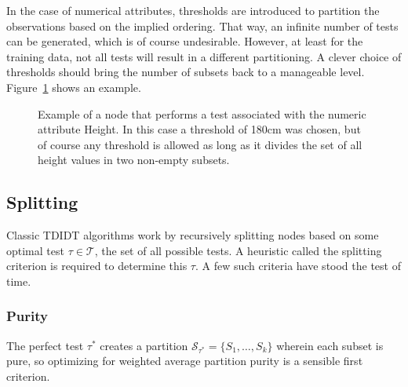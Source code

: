 In the case of numerical attributes, thresholds are introduced to partition the observations based on the implied ordering. That way, an infinite number of tests can be generated, which is of course undesirable. However, at least for the training data, not all tests will result in a different partitioning. A clever choice of thresholds should bring the number of subsets back to a manageable level. Figure~\ref{fig:numerical_split} shows an example.

\begin{figure}[htp]%
\label{fig:numerical_split}
\begin{center}
\end{center}
\caption{Example of a node that performs a test associated with the numeric attribute Height. In this case a threshold of 180cm was chosen, but of course any threshold is allowed as long as it divides the set of all height values in two non-empty subsets.}
\end{figure}


\subsection{Splitting}
Classic TDIDT algorithms work by recursively splitting nodes based on some optimal test $\tau \in \mathcal{T}$, the set of all possible tests. A heuristic called the splitting criterion is required to determine this $\tau$. A few such criteria have stood the test of time.

\subsubsection{Purity}
The perfect test $\tau^*$ creates a partition $\mathcal{S}_{\tau^*} = \{S_1, \ldots, S_k\}$ wherein each subset is pure, so optimizing for weighted average partition purity is a sensible first criterion.

